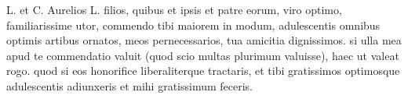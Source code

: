 


 L. et C. Aurelios L. filios, quibus et ipsis et patre eorum, viro optimo, familiarissime utor, commendo tibi maiorem in modum, adulescentis omnibus optimis artibus ornatos, meos pernecessarios, tua amicitia dignissimos. si ulla mea apud te commendatio valuit (quod scio multas plurimum valuisse), haec ut valeat rogo. quod si eos honorifice liberaliterque tractaris, et tibi gratissimos optimosque adulescentis adiunxeris et mihi gratissimum feceris.
